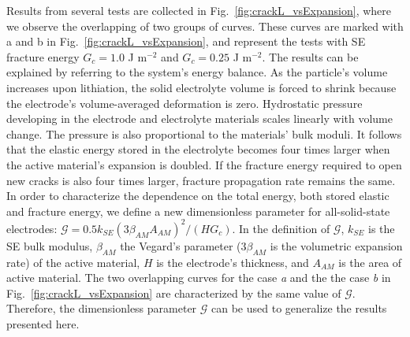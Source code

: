 \documentclass[final,5p,sort&compress]{elsarticle}
\begin{document}
Results from several tests are collected in Fig.~\ref{fig:crackL_vsExpansion}, where we observe the overlapping of two groups of curves.  
These curves are marked with a and b in Fig.~\ref{fig:crackL_vsExpansion}, and represent the tests with SE fracture energy $G_c = 1.0$ J m$^{-2}$ and $G_c = 0.25$ J m$^{-2}$.
The results can be explained by referring to the system's energy balance.
As the particle's volume increases upon lithiation, the solid electrolyte volume is forced to shrink because 
the electrode's volume-averaged deformation is zero.
%
Hydrostatic pressure developing in the electrode and electrolyte materials scales linearly with volume change. The pressure is also proportional to the materials' bulk moduli.
It follows that the elastic energy stored in the electrolyte becomes four times larger when the active material's expansion is doubled. If the fracture energy required to open new cracks is also four times larger,
fracture propagation rate remains the same. 
In order to characterize the dependence on the total energy, both stored elastic and fracture energy, we define a new dimensionless parameter for all-solid-state electrodes: 
$ \mathcal{G} = 0.5 k_{SE} (3 \beta_{AM} A_{AM})^2 / (H G_c)$.
%
%
In the definition of $ \mathcal{G}$, $k_{SE}$ is the SE bulk modulus, $ \beta_{AM} $ the Vegard's parameter ($3 \beta_{AM}$ is the volumetric expansion rate) of the active material, $H$ is the electrode's thickness, and $A_{AM}$ is the area of active material. 
The two overlapping curves for the case \emph{a} and the
the case \emph{b} in  Fig.~\ref{fig:crackL_vsExpansion} are characterized by the same value of $\mathcal{G}$. Therefore, the dimensionless parameter $\mathcal{G}$ can be used to generalize the results presented here.
  
\end{document}
